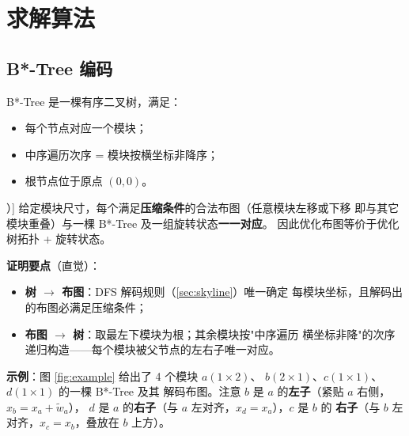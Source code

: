 \documentclass[12pt,a4paper]{article}
\begin{document}
\section{求解算法}

\subsection{B*-Tree 编码}
\label{sec:bstar}

B*-Tree 是一棵有序二叉树，满足：
\begin{itemize}
    \item 每个节点对应一个模块；
    \item 中序遍历次序 = 模块按横坐标非降序；
    \item 根节点位于原点 $(0,0)$。
\end{itemize}

\begin{tcolorbox}[colback=green!5, colframe=green!50!black, title=性质 1（表示完备性，见文献 [1]）]
给定模块尺寸，每个满足\textbf{压缩条件}的合法布图（任意模块左移或下移
即与其它模块重叠）与一棵 B*-Tree 及一组旋转状态\textbf{一一对应}。
因此优化布图等价于优化树拓扑 + 旋转状态。
\end{tcolorbox}

\textbf{证明要点}（直觉）：
\begin{itemize}
    \item \textbf{树 $\to$ 布图}：DFS 解码规则（\ref{sec:skyline}）唯一确定
    每模块坐标，且解码出的布图必满足压缩条件；
    \item \textbf{布图 $\to$ 树}：取最左下模块为根；其余模块按"中序遍历
    横坐标非降"的次序递归构造——每个模块被父节点的左右子唯一对应。
\end{itemize}

\textbf{示例}：图 \ref{fig:example} 给出了 4 个模块 $a(1\times2)$、
$b(2\times1)$、$c(1\times1)$、$d(1\times1)$ 的一棵 B*-Tree 及其
解码布图。注意 $b$ 是 $a$ 的\textbf{左子}（紧贴 $a$ 右侧，$x_b = x_a + \tilde w_a$），
$d$ 是 $a$ 的\textbf{右子}（与 $a$ 左对齐，$x_d = x_a$），$c$ 是 $b$ 的
\textbf{右子}（与 $b$ 左对齐，$x_c = x_b$，叠放在 $b$ 上方）。
\end{document}
